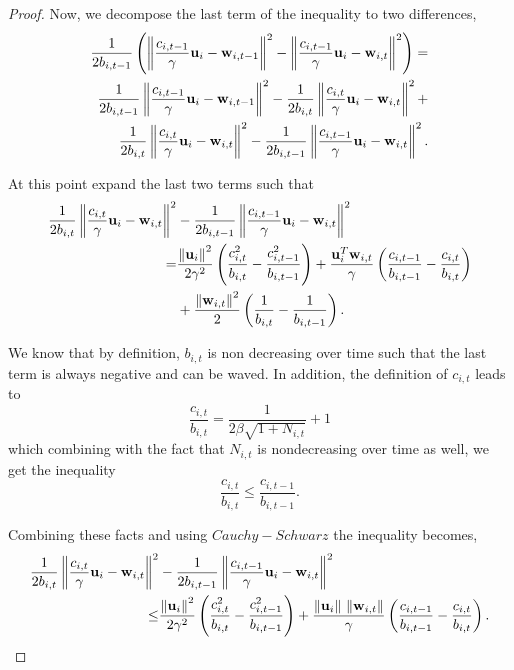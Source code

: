 {\begin{proof}
\noindent
Now, we decompose the last term of the inequality to two  differences,
\begin{equation*}
\begin{split}
\frac{1}{2b_{i,t-1}}
\left({\left\Vert {\frac{c_{i,t-1}}{\gamma} \mathbf{u}_i-\mathbf{w}_{i,t-1}} \right\Vert^2-\left\Vert {\frac{c_{i,t-1}}{\gamma} \mathbf{u}_i-\mathbf{w}_{i,t}} \right\Vert^2}\right)= \\
\frac{1}{2b_{i,t-1}}\left\Vert {\frac{c_{i,t-1}}{\gamma} \mathbf{u}_i-\mathbf{w}_{i,t-1}} \right\Vert^2-\frac{1}{2b_{i,t}}\left\Vert {\frac{c_{i,t}}{\gamma} \mathbf{u}_i-\mathbf{w}_{i,t}} \right\Vert^2+\\
\frac{1}{2b_{i,t}}\left\Vert {\frac{c_{i,t}}{\gamma} \mathbf{u}_i-\mathbf{w}_{i,t}} \right\Vert^2-\frac{1}{2b_{i,t-1}}\left\Vert {\frac{c_{i,t-1}}{\gamma} \mathbf{u}_i-\mathbf{w}_{i,t}} \right\Vert^2.
\end{split}
\end{equation*}

\noindent
At this point expand the last two terms such that
\begin{equation*}
\begin{split}
\frac{1}{2b_{i,t}}\left\Vert {\frac{c_{i,t}}{\gamma} \mathbf{u}_i-\mathbf{w}_{i,t}} \right\Vert^2&-\frac{1}{2b_{i,t-1}}\left\Vert {\frac{c_{i,t-1}}{\gamma} \mathbf{u}_i-\mathbf{w}_{i,t}} \right\Vert^2\\
=&\frac{\left\Vert {\mathbf{u}_i} \right\Vert^2}{2\gamma^2}\left({\frac{c_{i,t}^2}{b_{i,t}}-\frac{c_{i,t-1}^2}{b_{i,t-1}}}\right)+
\frac{\mathbf{u}_i^T\mathbf{w}_{i,t}}{\gamma}\left({\frac{c_{i,t-1}}{b_{i,t-1}}-\frac{c_{i,t}}{b_{i,t}}}\right)\\
&+\frac{\left\Vert {\mathbf{w}_{i,t}} \right\Vert^2}{2}\left({\frac{1}{b_{i,t}}-\frac{1}{b_{i,t-1}}}\right).
\end{split}
\end{equation*}

\noindent
We know that by definition, $b_{i,t}$ is non decreasing over time such that the last term is always negative 
and can be waved. In addition,  the definition of $c_{i,t}$  leads to 
\begin{equation*}
\frac{c_{i,t}}{b_{i,t}}=\frac{1}{2\beta\sqrt{1+N_{i,t}}}+1
\end{equation*}
which combining with the fact that $N_{i,t}$ is nondecreasing over time as well, we get the inequality 
\begin{equation*}
\frac{c_{i,t}}{b_{i,t}}\le\frac{c_{i,t-1}}{b_{i,t-1}}.
\end{equation*}

\noindent
Combining these facts and using $Cauchy-Schwarz$ the inequality becomes,
\begin{equation}
\begin{split}
\frac{1}{2b_{i,t}}\left\Vert {\frac{c_{i,t}}{\gamma} \mathbf{u}_i-\mathbf{w}_{i,t}} \right\Vert^2&-\frac{1}{2b_{i,t-1}}\left\Vert {\frac{c_{i,t-1}}{\gamma} \mathbf{u}_i-\mathbf{w}_{i,t}} \right\Vert^2\\
\le&\frac{\left\Vert {\mathbf{u}_i} \right\Vert^2}{2\gamma^2}\left({\frac{c_{i,t}^2}{b_{i,t}}-\frac{c_{i,t-1}^2}{b_{i,t-1}}}\right)+
\frac{\Vert\mathbf{u}_i\Vert~\Vert\mathbf{w}_{i,t}\Vert}{\gamma}\left({\frac{c_{i,t-1}}{b_{i,t-1}}-\frac{c_{i,t}}{b_{i,t}}}\right).
\end{split}
\label{eq:AD_difference_of_norm_ineq}
\end{equation}


\end{proof}}
